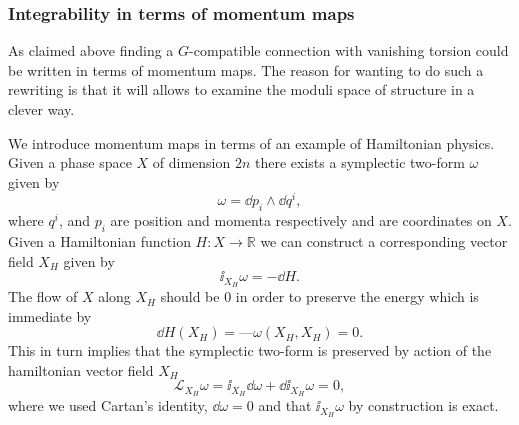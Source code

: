 \subsubsection{Integrability in terms of momentum maps}
As claimed above finding a $G$-compatible connection with vanishing torsion could be written in terms of momentum maps. The reason for wanting to do such a rewriting is that it will allows to examine the moduli space of structure in a clever way. 

We introduce momentum maps in terms of an example of Hamiltonian physics. Given a phase space $X$ of dimension $2n$ there exists a symplectic two-form $\omega$ given by
\begin{equation}
    \omega = \dd p_i\wedge\dd q^i,
\end{equation}
where $q^i$, and $p_i$ are position and momenta respectively and are coordinates on $X$. Given a Hamiltonian function $H: X\to\mathbb{R}$ we can construct a corresponding vector field $X_H$ given by 
\begin{equation}
    \ii _{X_H}\omega = -\dd H.
\end{equation}
The flow of $X$ along $X_H$ should be $0$ in order to preserve the energy which is immediate by 
\begin{equation}
    \dd H (X_H) = —\omega(X_H,X_H) = 0. 
\end{equation}
This in turn implies that the symplectic two-form is preserved by action of the hamiltonian vector field $X_H$ 
\begin{equation}
    \mathcal{L}_{X_H} \omega = \ii_{X_H}\dd \omega + \dd\ii_{X_H} \omega = 0,
\end{equation}
where we used Cartan's identity, $\dd\omega=0$ and that $\ii_{X_H}\omega$ by construction is exact. 

